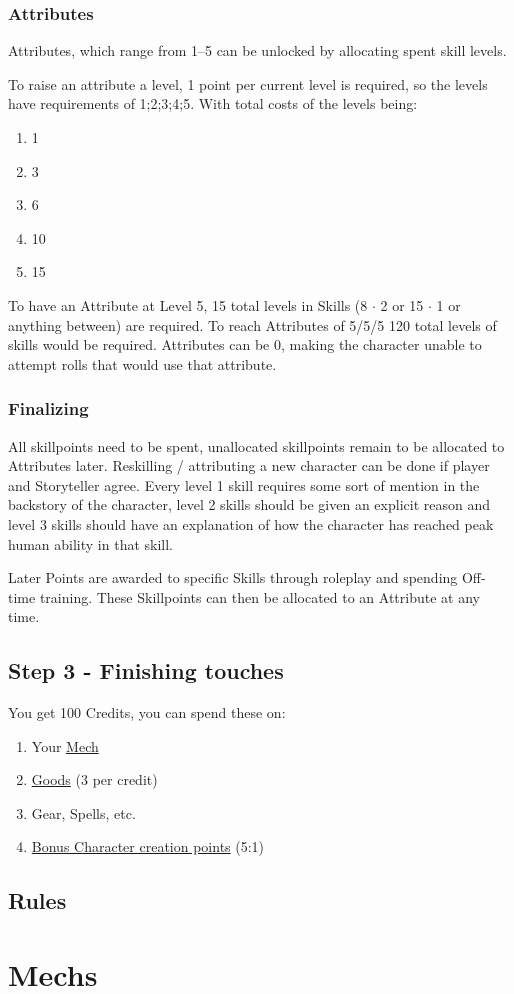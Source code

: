 \documentclass[a4paper]{book}
\begin{document}
\subsection{Attributes}\label{subsec:attributes}
Attributes, which range from 1--5 can be unlocked by allocating spent skill levels.\par
To raise an attribute a level, 1 point per current level is required, so the levels have requirements of 1;2;3;4;5.
With total costs of the levels being:\par
\begin{enumerate}
    \item 1
    \item 3
    \item 6
    \item 10
    \item 15
\end{enumerate}
To have an Attribute at Level 5, 15 total levels in Skills (8 $\cdot$ 2 or 15 $\cdot$ 1 or anything between) are
required.
To reach Attributes of 5/5/5 120 total levels of skills would be required.
Attributes can be 0, making the character unable to attempt rolls that would use that attribute.

\subsection{Finalizing}\label{subsec:finalizing}
All skillpoints need to be spent, unallocated skillpoints remain to be allocated to Attributes later.
Reskilling / attributing a new character can be done if player and Storyteller agree.
Every level 1 skill requires some sort of mention in the backstory of the character, level 2 skills should be given
an explicit reason and level 3 skills should have an explanation of how the character has reached peak human ability
in that skill.

Later Points are awarded to specific Skills through roleplay and spending Off-time training.
These Skillpoints can then be allocated to an Attribute at any time.

\section{Step 3 - Finishing touches}\label{sec:step3-finishingtouches}
You get 100 Credits, you can spend these on:
\begin{enumerate}[label = -]
    \item Your \hyperref[ch:mechs]{Mech}
    \item \hyperref[sec:tradegoods]{Goods} (3 per credit)
    \item Gear, Spells, etc.
    \item \hyperref[sec:step2-scores]{Bonus Character creation points} (5:1)
\end{enumerate}


\section{Rules}\label{sec:rules}



\chapter{Mechs}\label{ch:mechs}

\end{document}
